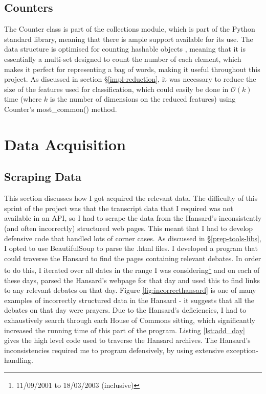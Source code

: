 \documentclass[12pt,a4paper,twoside,openright]{report}
\begin{document}
\subsection{Counters} 

The Counter class is part of the collections module, which is part of the Python standard library, meaning that there is ample support available for its use. The data structure is optimised for counting hashable objects \cite{pythoncollectionsdocs}, meaning that it is essentially a multi-set designed to count the number of each element, which makes it perfect for representing a bag of words, making it useful throughout this project. As discussed in section \S\ref{impl-reduction}, it was necessary to reduce the size of the features used for classification, which could easily be done in $\mathcal{O}(k)$ time (where $k$ is the number of dimensions on the reduced features) using Counter's most\_common() method.

\section{Data Acquisition} \label{impl-acquisition}
\subsection{Scraping Data} \label{impl-scraping}

This section discusses how I got acquired the relevant data. The difficulty of this sprint of the project was that the transcript data that I required was not available in an API, so I had to scrape the data from the Hansard's inconsistently (and often incorrectly) structured web pages. This meant that I had to develop defensive code that handled lots of corner cases. As discussed in \S\ref{prep-tools-libs}, I opted to use BeautifulSoup to parse the .html files.
\newline
I developed a program that could traverse the Hansard to find the pages containing relevant debates. In order to do this, I iterated over all dates in the range I was considering\footnote{11/09/2001 to 18/03/2003 (inclusive)} and on each of these days, parsed the Hansard's webpage for that day and used this to find links to any relevant debates on that day. Figure \ref{fig:incorrecthansard} is one of many examples of incorrectly structured data in the Hansard - it suggests that all the debates on that day were prayers. Due to the Hansard's deficiencies, I had to exhaustively search through each House of Commons sitting, which significantly increased the running time of this part of the program. Listing \ref{lst:add_day} gives the high level code used to traverse the Hansard archives. The Hansard's inconsistencies required me to program defensively, by using extensive exception-handling.
\newline
\end{document}
